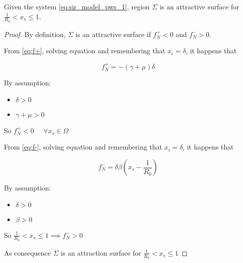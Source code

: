 \begin{lemma}
Given the system \ref{eq:sir_model_pws_1}, region $\Sigma$ is an attractive surface for $\frac{1}{R_0} < x_s \leq 1$.
\end{lemma}

\begin{proof}
By definition, $\Sigma$ is an attractive surface if $f^+_N < 0$ and $f^-_N > 0$.

From \ref{eq:f+}, solving equation and remembering that $x_i = \delta$, it happens that

\begin{equation}
    f^+_N = -(\gamma + \mu)\delta
\end{equation}

By assumption:
\begin{itemize}
    \item $\delta > 0$
    \item $\gamma + \mu > 0$
\end{itemize}
So $f^+_N < 0 \;\;\;\;\; \forall x_s \in \Omega$

From \ref{eq:f-}, solving equation and remembering that $x_i = \delta$, it happens that

\begin{equation}
    f^-_N = \delta\beta\left(x_s-\frac{1}{R_0}\right)
\end{equation}

By assumption:
\begin{itemize}
    \item $\delta > 0$
    \item $\beta > 0$
\end{itemize}
So $\frac{1}{R_0} < x_s \leq 1 \implies f^-_N > 0$

As consequence $\Sigma$ is an attraction surface for $\frac{1}{R_0} < x_s \leq 1$ 
\end{proof}